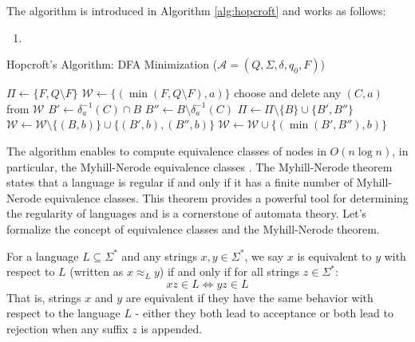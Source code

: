 The algorithm is introduced in Algorithm \ref{alg:hopcroft} and works as follows:
\begin{enumerate}
    \item 
\end{enumerate}

\begin{algorithm} \label{alg:hopcroft}
    \caption{Hopcroft's Algorithm: DFA Minimization ($\mathcal{A} = (Q, \Sigma, \delta, q_0, F)$)}
    \begin{algorithmic}[1]
        \State $\Pi \gets \{F, Q \setminus F\}$
            \State $\mathcal{W} \gets \{(\min(F, Q \setminus F), a)\}$ 
        \EndFor
            \State choose and delete any $(C, a)$ from $\mathcal{W}$
                    \State $B' \gets \delta_a^{-1}(C) \cap B$
                    \State $B'' \gets B \setminus \delta_a^{-1}(C)$
                    \State $\Pi \gets \Pi \setminus \{B\} \cup \{B', B''\}$
                            \State $\mathcal{W} \gets \mathcal{W} \setminus \{(B, b)\} \cup \{(B', b), (B'', b)\}$
                        \Else
                            \State $\mathcal{W} \gets \mathcal{W} \cup \{(\min(B', B''), b)\}$
                        \EndIf
                    \EndFor
                \EndIf
            \EndFor
        \EndWhile
    \end{algorithmic}
\end{algorithm}


The algorithm enables to compute equivalence classes of nodes in $O(n\log n)$, in particular, the Myhill-Nerode equivalence classes . The Myhill-Nerode theorem states that a language is regular if and only if it has a finite number of Myhill-Nerode equivalence classes. This theorem provides a powerful tool for determining the regularity of languages and is a cornerstone of automata theory. Let's formalize the concept of equivalence classes and the Myhill-Nerode theorem.

\begin{definition}
    For a language $L \subseteq \Sigma^*$ and any strings $x,y \in \Sigma^*$, we say $x$ is equivalent to $y$ with respect to $L$ (written as $x \approx_L y$) if and only if for all strings $z \in \Sigma^*$:
    \[ xz \in L \Leftrightarrow yz \in L \]
    That is, strings $x$ and $y$ are equivalent if they have the same behavior with respect to the language $L$ - either they both lead to acceptance or both lead to rejection when any suffix $z$ is appended.
\end{definition}

